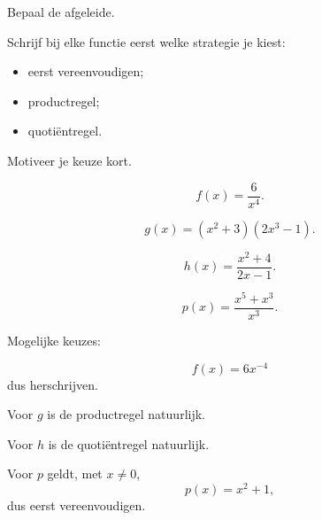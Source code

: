 \documentclass{ximera}
\begin{document}

\FVDendExercises



\FVDbeginExercises



\begin{oefening}{\oefU\ESS}

Bepaal de afgeleide.

Schrijf bij elke functie eerst welke strategie je kiest:
\begin{itemize}
  \item eerst vereenvoudigen;
  \item productregel;
  \item quotiëntregel.
\end{itemize}

Motiveer je keuze kort.

\begin{question}
\[
f(x)=\frac{6}{x^4}.
\]
\end{question}

\begin{question}
\[
g(x)=(x^2+3)(2x^3-1).
\]
\end{question}

\begin{question}
\[
h(x)=\frac{x^2+4}{2x-1}.
\]
\end{question}

\begin{question}
\[
p(x)=\frac{x^5+x^3}{x^3}.
\]
\end{question}

\begin{oplossing}
Mogelijke keuzes:

\[
f(x)=6x^{-4}
\]
dus herschrijven.

Voor $g$ is de productregel natuurlijk.

Voor $h$ is de quotiëntregel natuurlijk.

Voor $p$ geldt, met $x\neq0$,
\[
p(x)=x^2+1,
\]
dus eerst vereenvoudigen.
\end{oplossing}

\end{oefening}


\end{document}
